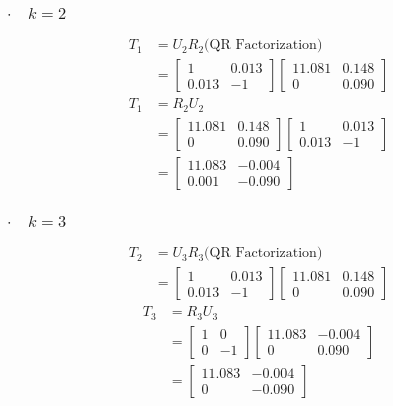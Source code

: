 \newpage
\subsubsection{$\cdot\quad k = 2$}
\begin{align*}
    T_1 &= U_2R_2\text{(QR Factorization)}\\
    &= \begin{bmatrix}
        1 & 0.013\\
        0.013 & -1
    \end{bmatrix} \begin{bmatrix}
        11.081 & 0.148\\
        0 & 0.090
    \end{bmatrix}
\end{align*}
\begin{align*}
    T_1 &= R_2U_2\\
    &= \begin{bmatrix}
        11.081 & 0.148\\
        0 & 0.090
    \end{bmatrix} \begin{bmatrix}
        1 & 0.013\\
        0.013 & -1
    \end{bmatrix}\\
    &= \begin{bmatrix}
        11.083 & -0.004\\
        0.001 & -0.090
    \end{bmatrix}
\end{align*}

\subsubsection{$\cdot\quad k = 3$}
\begin{align*}
    T_2 &= U_3R_3\text{(QR Factorization)}\\
    &= \begin{bmatrix}
        1 & 0.013\\
        0.013 & -1
    \end{bmatrix} \begin{bmatrix}
        11.081 & 0.148\\
        0 & 0.090
    \end{bmatrix}
\end{align*}
\begin{align*}
    T_3 &= R_3U_3\\
    &= \begin{bmatrix}
        1 & 0\\
        0 & -1
    \end{bmatrix} \begin{bmatrix}
        11.083 & -0.004\\
        0 & 0.090
    \end{bmatrix}\\
    &= \begin{bmatrix}
        11.083 & -0.004\\
        0 & -0.090
    \end{bmatrix}
\end{align*}


